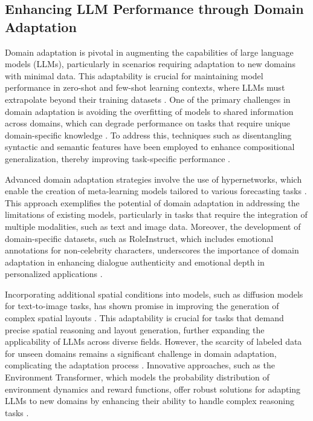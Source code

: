 \subsection{Enhancing LLM Performance through Domain Adaptation} \label{subsec:Enhancing LLM Performance through Domain Adaptation}



Domain adaptation is pivotal in augmenting the capabilities of large language models (LLMs), particularly in scenarios requiring adaptation to new domains with minimal data. This adaptability is crucial for maintaining model performance in zero-shot and few-shot learning contexts, where LLMs must extrapolate beyond their training datasets \cite{chowdhery2023palm}. One of the primary challenges in domain adaptation is avoiding the overfitting of models to shared information across domains, which can degrade performance on tasks that require unique domain-specific knowledge \cite{wang2022rethinkingminimalsufficientrepresentation}. To address this, techniques such as disentangling syntactic and semantic features have been employed to enhance compositional generalization, thereby improving task-specific performance \cite{zheng2023layerwiserepresentationfusioncompositional}.



Advanced domain adaptation strategies involve the use of hypernetworks, which enable the creation of meta-learning models tailored to various forecasting tasks \cite{stank2024designingtimeseriesmodelshypernetworks}. This approach exemplifies the potential of domain adaptation in addressing the limitations of existing models, particularly in tasks that require the integration of multiple modalities, such as text and image data. Moreover, the development of domain-specific datasets, such as RoleInstruct, which includes emotional annotations for non-celebrity characters, underscores the importance of domain adaptation in enhancing dialogue authenticity and emotional depth in personalized applications \cite{tao2024rolecraftglmadvancingpersonalizedroleplaying}.



Incorporating additional spatial conditions into models, such as diffusion models for text-to-image tasks, has shown promise in improving the generation of complex spatial layouts \cite{zhang2023adding}. This adaptability is crucial for tasks that demand precise spatial reasoning and layout generation, further expanding the applicability of LLMs across diverse fields. However, the scarcity of labeled data for unseen domains remains a significant challenge in domain adaptation, complicating the adaptation process \cite{wang2019pairedopenendedtrailblazerpoet}. Innovative approaches, such as the Environment Transformer, which models the probability distribution of environment dynamics and reward functions, offer robust solutions for adapting LLMs to new domains by enhancing their ability to handle complex reasoning tasks \cite{wang2023environmenttransformerpolicyoptimization}.



